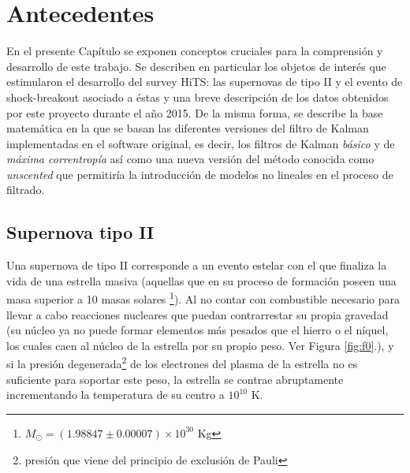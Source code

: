 \chapter{Antecedentes}
\label{ch:background}
En el presente Cap\'itulo se exponen conceptos cruciales para la comprensi\'on y desarrollo de este trabajo. Se describen en particular los objetos de inter\'es que estimularon el desarrollo del survey HiTS: las supernovas de tipo II y el evento de shock-breakout asociado a \'estas y una breve descripci\'on de los datos obtenidos por este proyecto durante el a\~no 2015. De la misma forma, se describe la base matem\'atica en la que se basan las diferentes versiones del filtro de Kalman implementadas en el software original, es decir, los filtros de Kalman \textit{b\'asico} y de \textit{m\'axima correntrop\'ia} as\'i como una nueva versi\'on del m\'etodo conocida como \textit{unscented} que permitir\'ia la introducci\'on de modelos no lineales en el proceso de filtrado.  

\section{Supernova tipo II}\label{sec:sn}
Una supernova de tipo II corresponde a un evento estelar con el que finaliza la vida de una estrella masiva (aquellas que en su proceso de formaci\'on poseen una masa superior a 10 masas solares \footnote{$M_{\odot} = (1.98847 \pm 0.00007) \times 10^{30}$ Kg}). Al no contar con combustible necesario para llevar a cabo reacciones nucleares que puedan contrarrestar su propia gravedad (su n\'ucleo ya no puede formar elementos m\'as pesados que el hierro o el n\'iquel, los cuales caen al n\'ucleo de la estrella por su propio peso. Ver Figura \ref{fig:f0}.), y si la presi\'on degenerada\footnote{presi\'on que viene del principio de exclusi\'on de Pauli} de los electrones del plasma de la estrella no es suficiente para soportar este peso, la estrella se contrae abruptamente incrementando la temperatura de su centro a $10^{10}$ K.
\bigskip

